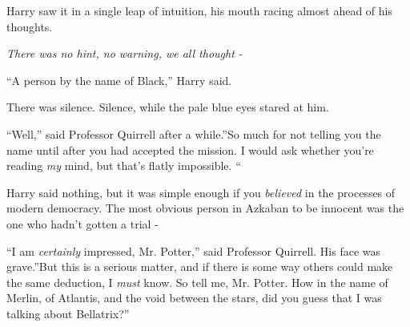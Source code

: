 Harry saw it in a single leap of intuition, his mouth racing almost
ahead of his thoughts.

\emph{There was no hint, no warning, we all thought -}

``A person by the name of Black,'' Harry said.

There was silence. Silence, while the pale blue eyes stared at him.

``Well,'' said Professor Quirrell after a while.''So much for not
telling you the name until after you had accepted the mission. I would
ask whether you're reading \emph{my} mind, but that's flatly impossible.
``

Harry said nothing, but it was simple enough if you \emph{believed} in
the processes of modern democracy. The most obvious person in Azkaban to
be innocent was the one who hadn't gotten a trial -

``I am \emph{certainly} impressed, Mr. Potter,'' said Professor Quirrell.
His face was grave.''But this is a serious matter, and if there is some
way others could make the same deduction, I \emph{must} know. So tell
me, Mr. Potter. How in the name of Merlin, of Atlantis, and the void
between the stars, did you guess that I was talking about Bellatrix?''
